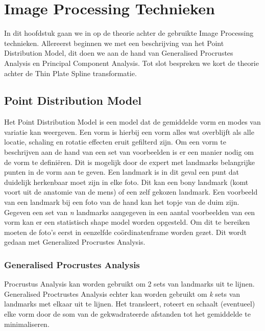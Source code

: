 \section{Image Processing Technieken}
\label{Image Processing Technieken}
In dit hoofdstuk gaan we in op de theorie achter de gebruikte Image Processing technieken. 
Allereerst beginnen we met een beschrijving van het Point Distribution Model, dit doen we aan de hand van Generalised Procrustes Analysis en Principal Component Analysis. 
Tot slot bespreken we kort de theorie achter de Thin Plate Spline transformatie. 

\subsection{Point Distribution Model}
Het Point Distribution Model is een model dat de gemiddelde vorm en modes van variatie kan weergeven.\cite{PDM} 
Een vorm is hierbij een vorm alles wat overblijft als alle locatie, schaling en rotatie effecten eruit gefilterd zijn.\cite{gpa}
Om een vorm te beschrijven aan de hand van een set van voorbeelden is er een manier nodig om de vorm te defini\"{e}ren. 
Dit is mogelijk door de expert met landmarks belangrijke punten in de vorm aan te geven. 
Een landmark is in dit geval een punt dat duidelijk herkenbaar moet zijn in elke foto. 
Dit kan een bony landmark (komt voort uit de anatomie van de mens) of een zelf gekozen landmark. 
Een voorbeeld van een landmark bij een foto van de hand kan het topje van de duim zijn. 
Gegeven een set van \textit{n} landmarks aangegeven in een aantal voorbeelden van een vorm kan er een statistisch shape model worden opgesteld. 
Om dit te bereiken moeten de foto's eerst in eenzelfde co\"{o}rdinatenframe worden gezet. 
Dit wordt gedaan met Generalized Procrustes Analysis.

\subsubsection{Generalised Procrustes Analysis}
Procrustus Analysis kan worden gebruikt om 2 sets van landmarks uit te lijnen. 
Generalised Proctrustes Analysis echter kan worden gebruikt om \textit{k} sets van landmarks met elkaar uit te lijnen. 
Het transleert, roteert en schaalt (eventueel) elke vorm door de som van de gekwadrateerde afstanden tot het gemiddelde te minimaliseren. 

